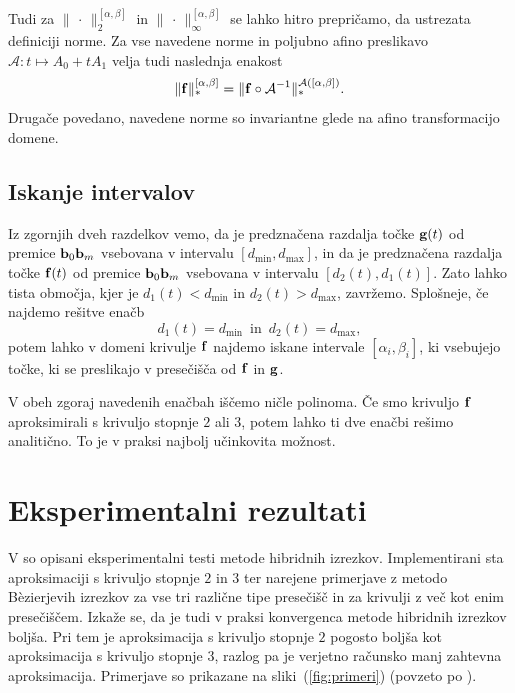 \documentclass[12pt,a4paper, reqno]{amsart}
\let\oldref\ref
\renewcommand{\ref}[1]{(\oldref{#1})}
\begin{document}
Tudi za $\lVert \,\cdot\, \rVert _2^{[\alpha,\beta]}$ in $\lVert \,\cdot\, \rVert _\infty^{[\alpha,\beta]}$ se lahko hitro prepričamo, da ustrezata definiciji norme. Za vse navedene norme in poljubno afino preslikavo $\mathcal{A}: t\mapsto A_0 + tA_1$ velja tudi naslednja enakost 
\begin{equation*}
\lVert {\bf f} \rVert _{\ast}^{[\alpha,\beta]} = 
\lVert {\bf f} \circ \mathcal{A}^{-1} \rVert _{\ast}^{\mathcal{A}([\alpha,\beta])}.
\end{equation*}
Drugače povedano, navedene norme so invariantne glede na afino transformacijo domene.





\subsection{Iskanje intervalov}
Iz zgornjih dveh razdelkov vemo, da je predznačena razdalja točke ${\bf g}(t)$ od premice ${\bf b}_0{\bf b}_m$ vsebovana v intervalu $[d_{\text{min}}, d_{\text{max}}]$, in da je predznačena razdalja točke ${\bf f}(t)$ od premice ${\bf b}_0{\bf b}_m$ vsebovana v intervalu $[d_2(t), d_1(t)]$. Zato lahko tista območja, kjer je $d_1(t) < d_{\text{min}}$ in $d_2(t) > d_{\text{max}}$, zavržemo. Splošneje, če najdemo rešitve enačb
$$
d_1(t) = d_{\text{min}} \, \text{ in } \, d_2(t) = d_{\text{max}},
$$
potem lahko v domeni krivulje ${\bf f}$ najdemo iskane intervale $[\alpha _i, \beta _i]$, ki vsebujejo točke, ki se preslikajo v presečišča od ${\bf f}$ in ${\bf g}$.

V obeh zgoraj navedenih enačbah iščemo ničle polinoma. Če smo krivuljo ${\bf f}$ aproksimirali s krivuljo stopnje $2$ ali $3$, potem lahko ti dve enačbi rešimo analitično. To je v praksi najbolj učinkovita možnost.




\section{Eksperimentalni rezultati}
V \cite{hyb_clip} so opisani eksperimentalni testi metode hibridnih izrezkov. Implementirani sta aproksimaciji s krivuljo stopnje $2$ in $3$ ter narejene primerjave z metodo B\`{e}zierjevih izrezkov za vse tri različne tipe presečišč in za krivulji z več kot enim presečiščem. Izkaže se, da je tudi v praksi konvergenca metode hibridnih izrezkov boljša. Pri tem je aproksimacija s krivuljo stopnje $2$ pogosto boljša kot aproksimacija s krivuljo stopnje $3$, razlog pa je verjetno računsko manj zahtevna aproksimacija. Primerjave so prikazane na sliki~\ref{fig:primeri} (povzeto po \cite{hyb_clip}).
\end{document}
